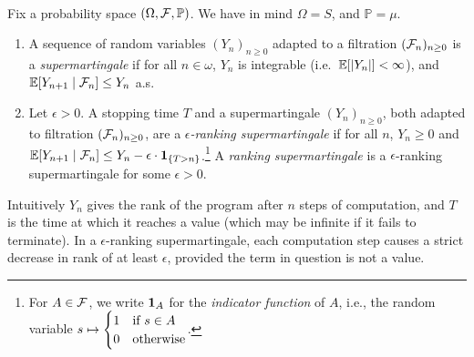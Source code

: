 \paragraph{}

Fix a probability space $(\Omega, \mathcal{F}, \mathbb{P})$. 
We have in mind $\Omega = S$, and $\mathbb{P} = \mu$.

\begin{definition}\rm
\begin{enumerate}
\item A sequence of random variables $(Y_n)_{n \geq 0}$ adapted to a filtration $(\mathcal{F}_n)_{n \geq 0}$ is a \emph{supermartingale} if for all $n \in \omega$, $Y_n$ is integrable (i.e.~$\mathbb{E}[|Y_n|] < \infty$), and $\mathbb{E}[Y_{n+1} \mid \mathcal{F}_n] \leq Y_n$ a.s.~
\item Let $\epsilon > 0$. A stopping time $T$ and a supermartingale $(Y_n)_{n \geq 0}$, both adapted to filtration $(\mathcal{F}_n)_{n \geq 0}$, are a \emph{$\epsilon$-ranking supermartingale} if for all $n$, $Y_n \geq 0$ and $\mathbb{E}[Y_{n+1} \mid \mathcal{F}_n] \leq Y_n - \epsilon \cdot \mathbf{1}_{\{T > n\}}$.\footnote{For $A \in \mathcal{F}$, we write ${\bf 1}_A$ for the \emph{indicator function} of $A$, i.e., the random variable $s \mapsto \begin{cases}
1 & \hbox{if $s \in A$}\\
0 & \hbox{otherwise}
\end{cases}$.}
A \emph{ranking supermartingale} is a $\epsilon$-ranking supermartingale for some $\epsilon > 0$.
\end{enumerate}
\end{definition}

\begin{remark}
\end{remark}

Intuitively $Y_n$ gives the rank of the program after $n$ steps of computation, and $T$ is the time at which it reaches a value (which may be infinite if it fails to terminate).
In a $\epsilon$-ranking supermartingale, each computation step causes a strict decrease in rank of at least $\epsilon$, provided the term in question is not a value.

